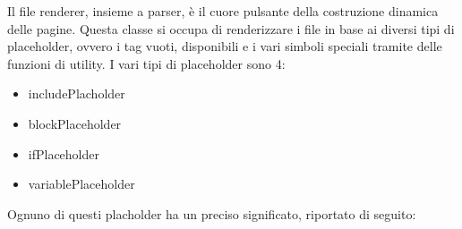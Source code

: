 Il file renderer, insieme a parser, è il cuore pulsante della costruzione dinamica delle pagine. Questa classe si occupa di renderizzare i file in base ai diversi tipi di placeholder, ovvero i tag vuoti, disponibili e i vari simboli speciali 
tramite delle funzioni di utility. 
I vari tipi di placeholder sono 4:

\begin{itemize}
    
	\item includePlacholder
    \item blockPlaceholder
	\item ifPlaceholder
	\item variablePlaceholder
	
\end{itemize}

Ognuno di questi placholder ha un preciso significato, riportato di seguito:

